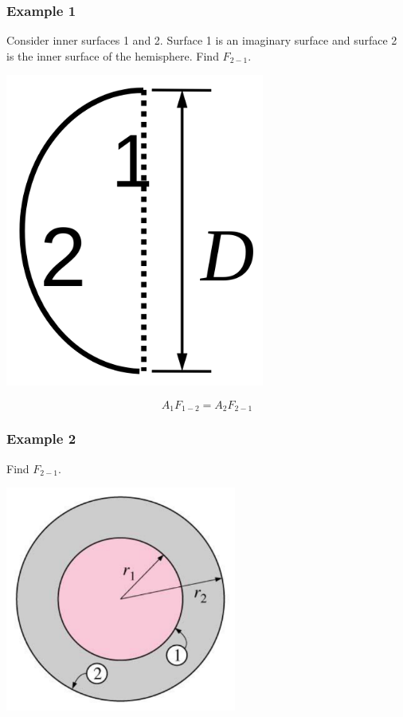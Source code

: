 \documentclass[11pt]{article}
\begin{document}
\subsubsection{Example 1}
\label{sec:org550e36b}
Consider inner surfaces 1 and 2. Surface 1 is an imaginary surface and surface 2 is the inner surface of the hemisphere. Find \(F_{2-1}\).
\begin{center}
\includegraphics[width=.9\linewidth]{./images/reciprocity-relation-example-1-diagram.png}
\end{center}
\[A_1 F_{1-2} = A_2 F_{2-1}\]

 \newpage

\subsubsection{Example 2}
\label{sec:orgcceccf1}
Find \(F_{2-1}\).
\begin{center}
\includegraphics[height=20em]{./images/sphere-enclosed-within-another-sphere-diagram.png}
\end{center}
\end{document}
